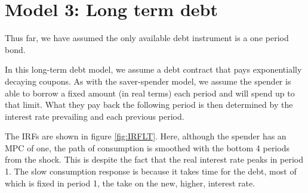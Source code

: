 \documentclass[AER]{AEA}
\begin{document}
\section{Model 3: Long term debt}

Thus far, we have assumed the only available debt instrument is a one period bond.

In this long-term debt model, we assume a debt contract that pays exponentially decaying coupons. As with the saver-spender model, we assume the spender is able to borrow a fixed amount (in real terms) each period and will spend up to that limit. What they pay back the following period is then determined by the interest rate prevailing and each previous period.

The IRFs are shown in figure \ref{fig:IRFLT}. Here, although the spender has an MPC of one, the path of consumption is smoothed with the bottom 4 periods from the shock. This is despite the fact that the real interest rate peaks in period 1. The slow consumption response is because it takes time for the debt, most of which is fixed in period 1, the take on the new, higher, interest rate.
 
\end{document}
